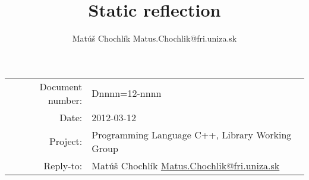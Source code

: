 \documentclass[11pt,a4paper,oneside]{article}
\title{Static reflection}
\author{Mat\'{u}\v{s} Chochl\'{i}k Matus.Chochlik@fri.uniza.sk}
\begin{document}
\begin{tabular}{r l}
Document number: & Dnnnn=12-nnnn\\
Date: & 2012-03-12 \\
Project: & Programming Language C++, Library Working Group \\
Reply-to: & Mat\'{u}\v{s} Chochl\'{i}k \href{mailto:Matus.Chochlik@fri.uniza.sk}{Matus.Chochlik@fri.uniza.sk}\\
\end{tabular}


\tableofcontents








\end{document}

